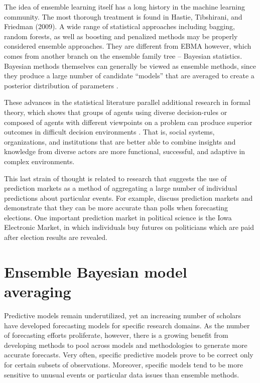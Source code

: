 \documentclass[12pt,fullpage,endnotes]{article}
\begin{document}
The idea of ensemble learning itself has a long history in the machine
learning community. The most thorough treatment is found in Hastie,
Tibshirani, and Friedman (2009).  A wide range of statistical
approaches including bagging, random forests, as well as boosting and
penalized methods may be properly considered ensemble approaches. They
are different from EBMA however, which comes from another branch on
the ensemble family tree -- Bayesian statistics.  Bayesian methods
themselves can generally be viewed as ensemble methods, since they
produce a large number of candidate ``models'' that are averaged to
create a posterior distribution of parameters
\citep[p. 605]{Hastie:2009}.

These advances in the statistical literature parallel additional
research in formal theory, which shows that groups of agents using
diverse decision-rules or composed of agents with different viewpoints
on a problem can produce superior outcomes in difficult decision
environments \citep{Page:2007, Page:2008, Page:2011}.  That is, social
systems, organizations, and institutions that are better able to
combine insights and knowledge from diverse actors are more
functional, successful, and adaptive in complex environments.  

This last strain of thought is related to research that suggests the
use of prediction markets as a method of aggregating a large number of
individual predictions about particular events. For example,
\citet{berg:2008} discuss prediction markets and demonstrate that they
can be more accurate than polls when forecasting elections. One
important prediction market in political science is the Iowa
Electronic Market, in which individuals buy futures on politicians
which are paid after election results are revealed.


\section{Ensemble Bayesian model averaging} 

Predictive models remain underutilized, yet an increasing number of
scholars have developed forecasting models for specific research
domains.  As the number of forecasting efforts proliferate, however,
there is a growing benefit from developing methods to pool across
models and methodologies to generate more accurate forecasts.  Very
often, specific predictive models prove to be correct only for certain
subsets of observations.  Moreover, specific models tend to be more
sensitive to unusual events or particular data issues than ensemble
methods.
\end{document}
